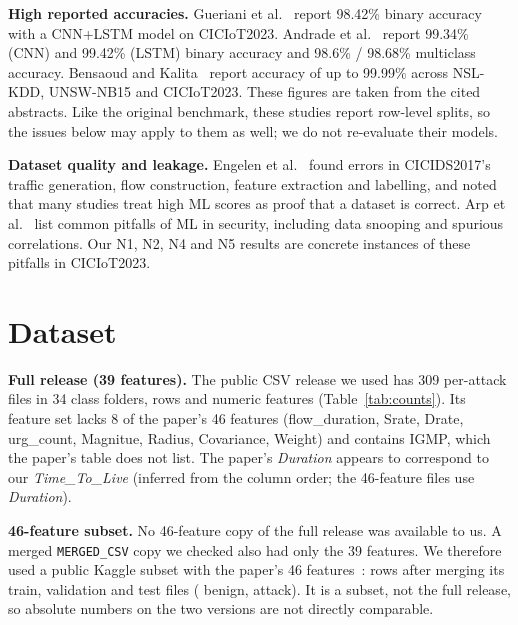 \documentclass[conference]{IEEEtran}
\begin{document}
\textbf{High reported accuracies.} Gueriani et al.~\cite{gueriani2024cnnlstm} report 98.42\% binary accuracy
with a CNN+LSTM model on CICIoT2023. Andrade et al.~\cite{andrade2026dlids} report 99.34\% (CNN) and 99.42\%
(LSTM) binary accuracy and 98.6\% / 98.68\% multiclass accuracy. Bensaoud and Kalita~\cite{bensaoud2025hybrid}
report accuracy of up to 99.99\% across NSL-KDD, UNSW-NB15 and CICIoT2023. These figures are taken from the
cited abstracts. Like the original benchmark, these studies report row-level splits, so the issues below may
apply to them as well; we do not re-evaluate their models.

\textbf{Dataset quality and leakage.} Engelen et al.~\cite{engelen2021troubleshooting} found errors in
CICIDS2017's traffic generation, flow construction, feature extraction and labelling, and noted that many
studies treat high ML scores as proof that a dataset is correct. Arp et al.~\cite{arp2022dos} list common
pitfalls of ML in security, including data snooping and spurious correlations. Our N1, N2, N4 and N5 results
are concrete instances of these pitfalls in CICIoT2023.

\section{Dataset}
\textbf{Full release (39 features).} The public CSV release we used has 309 per-attack files in 34 class
folders, \fullRows{} rows and \fullFeat{} numeric features (Table~\ref{tab:counts}). Its feature set lacks 8 of
the paper's 46 features (flow\_duration, Srate, Drate, urg\_count, Magnitue, Radius, Covariance, Weight) and
contains IGMP, which the paper's table does not list. The paper's \emph{Duration} appears to correspond to
our \emph{Time\_To\_Live} (inferred from the column order; the 46-feature files use \emph{Duration}).

\textbf{46-feature subset.} No 46-feature copy of the full release was available to us. A merged
\texttt{MERGED\_CSV} copy we checked also had only the 39 features. We therefore used a public Kaggle subset
with the paper's 46 features~\cite{kaggle46}: \vfRows{} rows after merging its train, validation and test files
(\vfBenign{} benign, \vfAttack{} attack). It is a subset, not the full release, so absolute numbers on the two
versions are not directly comparable.



\end{document}
